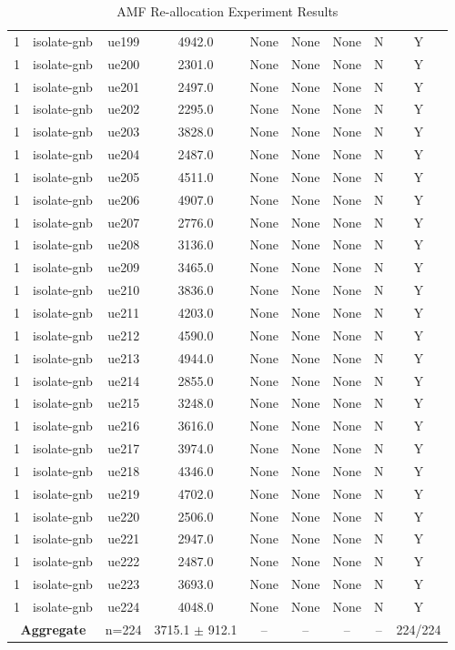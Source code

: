 \begin{table}[ht]
\begin{tabular}{|c|c|c|c|c|c|c|c|c|}
1 & isolate-gnb & ue199 & 4942.0 & None & None & None & N & Y \\
1 & isolate-gnb & ue200 & 2301.0 & None & None & None & N & Y \\
1 & isolate-gnb & ue201 & 2497.0 & None & None & None & N & Y \\
1 & isolate-gnb & ue202 & 2295.0 & None & None & None & N & Y \\
1 & isolate-gnb & ue203 & 3828.0 & None & None & None & N & Y \\
1 & isolate-gnb & ue204 & 2487.0 & None & None & None & N & Y \\
1 & isolate-gnb & ue205 & 4511.0 & None & None & None & N & Y \\
1 & isolate-gnb & ue206 & 4907.0 & None & None & None & N & Y \\
1 & isolate-gnb & ue207 & 2776.0 & None & None & None & N & Y \\
1 & isolate-gnb & ue208 & 3136.0 & None & None & None & N & Y \\
1 & isolate-gnb & ue209 & 3465.0 & None & None & None & N & Y \\
1 & isolate-gnb & ue210 & 3836.0 & None & None & None & N & Y \\
1 & isolate-gnb & ue211 & 4203.0 & None & None & None & N & Y \\
1 & isolate-gnb & ue212 & 4590.0 & None & None & None & N & Y \\
1 & isolate-gnb & ue213 & 4944.0 & None & None & None & N & Y \\
1 & isolate-gnb & ue214 & 2855.0 & None & None & None & N & Y \\
1 & isolate-gnb & ue215 & 3248.0 & None & None & None & N & Y \\
1 & isolate-gnb & ue216 & 3616.0 & None & None & None & N & Y \\
1 & isolate-gnb & ue217 & 3974.0 & None & None & None & N & Y \\
1 & isolate-gnb & ue218 & 4346.0 & None & None & None & N & Y \\
1 & isolate-gnb & ue219 & 4702.0 & None & None & None & N & Y \\
1 & isolate-gnb & ue220 & 2506.0 & None & None & None & N & Y \\
1 & isolate-gnb & ue221 & 2947.0 & None & None & None & N & Y \\
1 & isolate-gnb & ue222 & 2487.0 & None & None & None & N & Y \\
1 & isolate-gnb & ue223 & 3693.0 & None & None & None & N & Y \\
1 & isolate-gnb & ue224 & 4048.0 & None & None & None & N & Y \\
\multicolumn{2}{|c|}{\textbf{Aggregate}} & n=224 & 3715.1 $\pm$ 912.1 & -- & -- & -- & -- & 224/224 \\
\hline
\end{tabular}
\caption{AMF Re-allocation Experiment Results}
\label{tab:amf_realloc}
\end{table}
